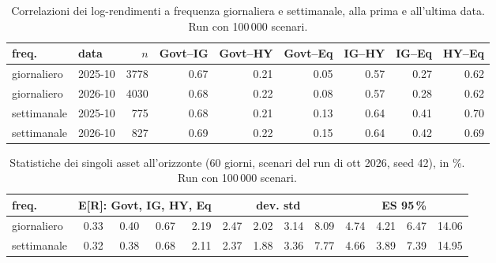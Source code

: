 \begin{table}[htbp]\centering\small\setlength{\tabcolsep}{3.5pt}
\caption{Correlazioni dei log-rendimenti a frequenza giornaliera e settimanale, alla prima e all'ultima data. Run con 100\,000 scenari.}\label{tab:corr}
\begin{tabular}{llrrrrrrr}\toprule
freq. & data & $n$ & Govt--IG & Govt--HY & Govt--Eq & IG--HY & IG--Eq & HY--Eq \\\midrule
giornaliero & 2025-10 & 3778 & 0.67 & 0.21 & 0.05 & 0.57 & 0.27 & 0.62 \\
giornaliero & 2026-10 & 4030 & 0.68 & 0.22 & 0.08 & 0.57 & 0.28 & 0.62 \\
settimanale & 2025-10 & 775 & 0.68 & 0.21 & 0.13 & 0.64 & 0.41 & 0.70 \\
settimanale & 2026-10 & 827 & 0.69 & 0.22 & 0.15 & 0.64 & 0.42 & 0.69 \\
\bottomrule\end{tabular}\end{table}

\begin{table}[htbp]\centering\small\setlength{\tabcolsep}{3.5pt}
\caption{Statistiche dei singoli asset all'orizzonte (60 giorni, scenari del run di ott 2026, seed 42), in \%. Run con 100\,000 scenari.}\label{tab:assets}
\begin{tabular}{lrrrrrrrrrrrr}\toprule
freq. & \multicolumn{4}{c}{E[R]: Govt, IG, HY, Eq} & \multicolumn{4}{c}{dev. std} & \multicolumn{4}{c}{ES 95\,\%} \\\midrule
giornaliero & 0.33 & 0.40 & 0.67 & 2.19 & 2.47 & 2.02 & 3.14 & 8.09 & 4.74 & 4.21 & 6.47 & 14.06 \\
settimanale & 0.32 & 0.38 & 0.68 & 2.11 & 2.37 & 1.88 & 3.36 & 7.77 & 4.66 & 3.89 & 7.39 & 14.95 \\
\bottomrule\end{tabular}\end{table}
